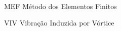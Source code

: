 

\imprimirfolhaderosto\

% 



% 

% 

%



\listoffigures*
\cleardoublepage

\listoftables*
\cleardoublepage


\begin{siglas}
  \item[MEF] Método dos Elementos Finitos
  \item[VIV] Vibração Induzida por Vórtice
\end{siglas}


\tableofcontents*
\cleardoublepage